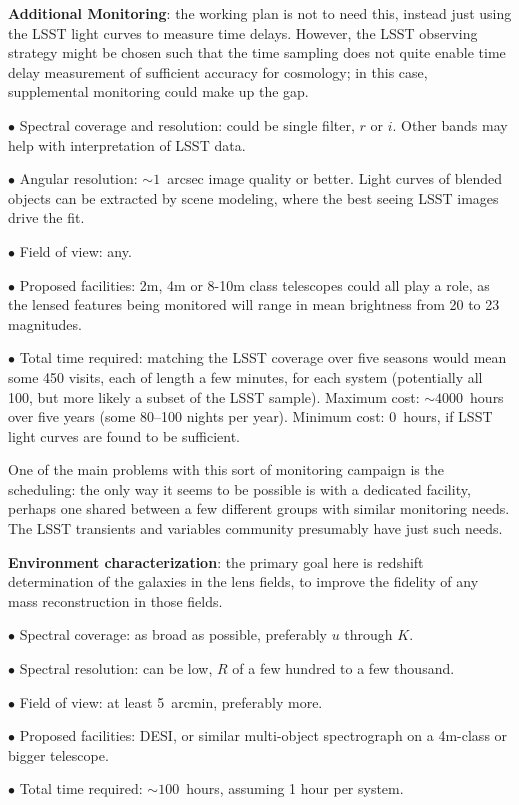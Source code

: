{\bf Additional Monitoring}: the working plan is not to need this, instead
just using the LSST light curves to measure time delays. However,
the LSST observing strategy might be chosen such that the time sampling
does not quite enable time delay measurement of sufficient accuracy for
cosmology; in this case, supplemental monitoring could make up the gap.

$\bullet$ Spectral coverage and resolution: could be single filter, $r$ or $i$. Other
bands may help with interpretation of LSST data.

$\bullet$ Angular resolution: $\sim1$~arcsec image quality or better.
Light curves of blended objects can be extracted by scene modeling,
where the best seeing LSST images drive the fit.

$\bullet$ Field of view: any.

$\bullet$ Proposed facilities: 2m, 4m or 8-10m class telescopes could
all play a role, as the lensed features being monitored will range in
mean brightness from 20 to 23 magnitudes.

$\bullet$ Total time required: matching the LSST coverage over five
seasons would mean some 450 visits, each of length a few minutes, for
each system (potentially all 100, but more likely a subset of the LSST
sample). Maximum cost: $\sim4000$~hours over five years  (some 80--100
nights per year). Minimum cost: $0$~hours, if LSST light curves are
found to be sufficient.

One of the main problems with this sort of monitoring campaign is the
scheduling: the only way it seems to be possible is with a dedicated
facility, perhaps one shared between a few different groups with similar
monitoring needs. The LSST transients and variables community presumably
have just such needs.


{\bf Environment characterization}: the primary goal here is redshift
determination of the galaxies in the lens fields, to improve the
fidelity of any mass reconstruction in those fields.

$\bullet$ Spectral coverage: as broad as possible, preferably $u$
through $K$.

$\bullet$ Spectral resolution: can be low, $R$ of a few hundred to a few
thousand.

$\bullet$ Field of view: at least 5~arcmin, preferably more.

$\bullet$ Proposed facilities: DESI, or similar multi-object spectrograph
on a 4m-class or bigger telescope.

$\bullet$ Total time required: $\sim100$~hours, assuming 1 hour per system.

